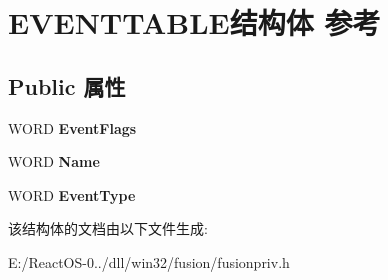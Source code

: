 \hypertarget{struct_e_v_e_n_t_t_a_b_l_e}{}\section{E\+V\+E\+N\+T\+T\+A\+B\+L\+E结构体 参考}
\label{struct_e_v_e_n_t_t_a_b_l_e}
\subsection*{Public 属性}
\begin{DoxyCompactItemize}
\item 
\mbox{\label{struct_e_v_e_n_t_t_a_b_l_e_a61408b98a4a6c23edac4e2bca2318391}} 
W\+O\+RD {\bfseries Event\+Flags}
\item 
\mbox{\label{struct_e_v_e_n_t_t_a_b_l_e_ac841bd2afaef386c881f58f07468983b}} 
W\+O\+RD {\bfseries Name}
\item 
\mbox{\label{struct_e_v_e_n_t_t_a_b_l_e_ac629a9340e0d00972d92313ccea86309}} 
W\+O\+RD {\bfseries Event\+Type}
\end{DoxyCompactItemize}


该结构体的文档由以下文件生成\+:\begin{DoxyCompactItemize}
\item 
E\+:/\+React\+O\+S-\/0../dll/win32/fusion/fusionpriv.\+h\end{DoxyCompactItemize}
